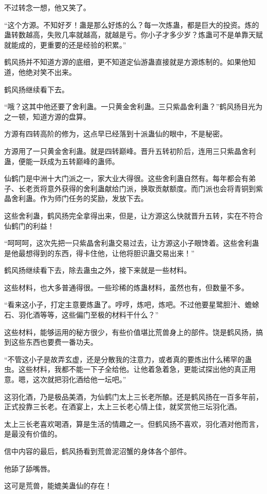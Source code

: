 \begin{this_body}
不过转念一想，他又笑了。

“这个方源。不知好歹！蛊是那么好炼的么？每一次炼蛊，都是巨大的投资。炼的蛊转数越高，失败几率就越高，就越是亏。你小子才多少岁？炼蛊可不是单靠天赋就能成的，更重要的还是经验的积累。”

鹤风扬并不知道方源的底细，更不知道定仙游蛊直接就是方源炼制的。如果他知道，他绝对笑不出来。

鹤风扬继续看下去。

“哦？这其中他还要了舍利蛊。一只黄金舍利蛊。三只紫晶舍利蛊？”鹤风扬目光为之一顿，知道方源的盘算。

方源有四转高阶的修为，这点早已经落到十派蛊仙的眼中，不是秘密。

方源用了一只黄金舍利蛊。就是四转巅峰。晋升五转初阶后，连用三只紫晶舍利蛊，便能一跃成为五转巅峰的蛊师。

仙鹤门是中洲十大门派之一，家大业大得很。这些舍利蛊自然有。每年都会有弟子、长老贡将意外获得的舍利蛊献给门派，换取贡献额度。而门派也会将青铜到紫晶舍利蛊。作为师门任务的奖励，发放下去。

这些舍利蛊，鹤风扬完全拿得出来，但是，让方源这么快就晋升五转，实在不符合仙鹤门的利益！

“呵呵呵，这次先把一只紫晶舍利蛊交易过去，让方源这小子眼馋着。这些舍利蛊是他最想得到的东西，得卡住他，让他将胆识蛊交易出来！”

鹤风扬继续看下去，除去蛊虫之外，接下来就是一些材料。

这些材料，也大多普通得很。一些珍稀的炼蛊材料，虽然也有，但数量不多。

“看来这小子，打定主意要炼蛊了。哼哼，炼吧，炼吧。不过他要星鹭胆汁、蟾蜍石、羽化酒等等，这些偏门至极的材料干什么？”

这些材料，能够运用的秘方很少，有些价值堪比荒兽身上的部件。饶是鹤风扬，搞到这些东西也要费一番功夫。

“不管这小子是故弄玄虚，还是分散我的注意力，或者真的要炼出什么稀罕的蛊虫。这些材料，我都不能一下子全给他。让他着急着急，更能试探出他的真正用意。嗯，这次就把羽化酒给他一坛吧。”

这羽化酒，乃是极品美酒，为仙鹤门太上三长老所酿。还是鹤风扬在一百多年前，正式投靠三长老。在酒宴上，太上三长老心情上佳，就奖赏他三坛羽化酒。

太上三长老喜欢喝酒，算是生活的情趣之一。但鹤风扬不喜欢，羽化酒对他而言，是最没有价值的。

信中内容的最后，鹤风扬看到荒兽泥沼蟹的身体各个部件。

他舔了舔嘴唇。

这可是荒兽，能媲美蛊仙的存在！


\end{this_body}
